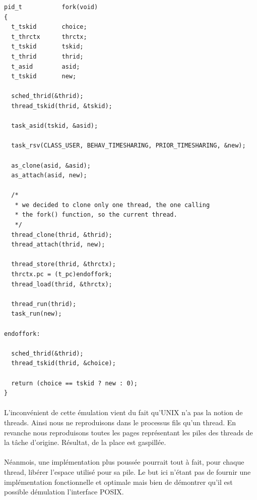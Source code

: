 \documentclass[10pt,a4wide]{article}
\begin{document}
\begin{verbatim}
pid_t           fork(void)
{
  t_tskid       choice;
  t_thrctx      thrctx;
  t_tskid       tskid;
  t_thrid       thrid;
  t_asid        asid;
  t_tskid       new;

  sched_thrid(&thrid);
  thread_tskid(thrid, &tskid);

  task_asid(tskid, &asid);

  task_rsv(CLASS_USER, BEHAV_TIMESHARING, PRIOR_TIMESHARING, &new);

  as_clone(asid, &asid);
  as_attach(asid, new);

  /*
   * we decided to clone only one thread, the one calling
   * the fork() function, so the current thread.
   */
  thread_clone(thrid, &thrid);
  thread_attach(thrid, new);

  thread_store(thrid, &thrctx);
  thrctx.pc = (t_pc)endoffork;
  thread_load(thrid, &thrctx);

  thread_run(thrid);
  task_run(new);

endoffork:

  sched_thrid(&thrid);
  thread_tskid(thrid, &choice);

  return (choice == tskid ? new : 0);
}
\end{verbatim}

\paragraph{}

L'inconv\'enient de cette \'emulation vient du fait qu'UNIX n'a pas
la notion de threads. Ainsi nous ne reproduisons dans le processus
fils qu'un thread. En revanche nous reproduisons toutes les pages
repr\'esentant les piles des threads de la t\^ache d'origine. R\'esultat,
de la place est gaspill\'ee.

\paragraph{}

N\'eanmois, une impl\'ementation plus pouss\'ee pourrait tout \`a fait,
pour chaque thread, lib\'erer l'espace utilis\'e pour sa pile. Le but
ici n'\'etant pas de fournir une impl\'ementation fonctionnelle et optimale
mais bien de d\'emontrer qu'il est possible d\'emulation l'interface POSIX.

\paragraph{}
\end{document}
